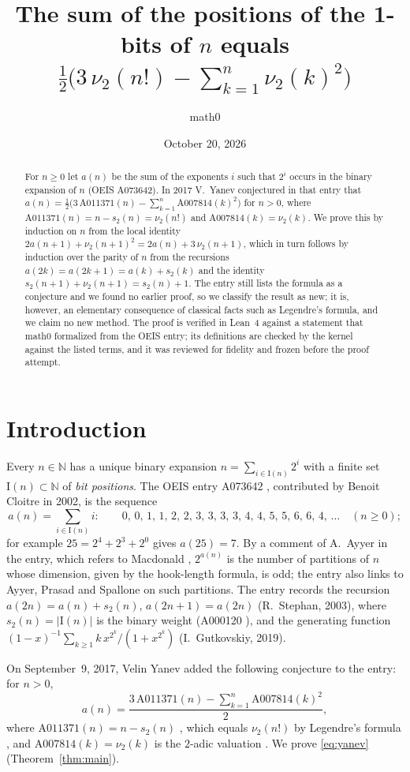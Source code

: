 \documentclass[11pt]{amsart}
\title[Yanev's identity for OEIS A073642]{The sum of the positions of the 1-bits of $n$ equals $\tfrac12\bigl(3\,\nu_2(n!)-\sum_{k=1}^{n}\nu_2(k)^2\bigr)$}
\author{math0}
\date{October 20, 2026}
\theoremstyle{plain}
\theoremstyle{definition}
\newcommand{\N}{\mathbb{N}}
\newcommand{\vt}{\nu_2}
\newcommand{\Bits}{\mathrm{I}}
\begin{document}
\begin{abstract}
For $n\ge0$ let $a(n)$ be the sum of the exponents $i$ such that $2^i$ occurs in the binary expansion of $n$ (OEIS A073642). In 2017 V.~Yanev conjectured in that entry that $a(n)=\frac12\bigl(3\,\mathrm{A011371}(n)-\sum_{k=1}^{n}\mathrm{A007814}(k)^2\bigr)$ for $n>0$, where $\mathrm{A011371}(n)=n-s_2(n)=\nu_2(n!)$ and $\mathrm{A007814}(k)=\nu_2(k)$.
We prove this by induction on $n$ from the local identity $2a(n+1)+\nu_2(n+1)^2=2a(n)+3\,\nu_2(n+1)$, which in turn follows by induction over the parity of $n$ from the recursions $a(2k)=a(2k+1)=a(k)+s_2(k)$ and the identity $s_2(n+1)+\nu_2(n+1)=s_2(n)+1$.
The entry still lists the formula as a conjecture and we found no earlier proof, so we classify the result as new; it is, however, an elementary consequence of classical facts such as Legendre's formula, and we claim no new method.
The proof is verified in Lean~4 against a statement that math0 formalized from the OEIS entry; its definitions are checked by the kernel against the listed terms, and it was reviewed for fidelity and frozen before the proof attempt.
\end{abstract}
\maketitle

\section{Introduction}

Every $n\in\N$ has a unique binary expansion $n=\sum_{i\in\Bits(n)}2^i$ with a finite set $\Bits(n)\subset\N$ of \emph{bit positions}. The OEIS entry A073642 \cite{A073642}, contributed by Benoit Cloitre in 2002, is the sequence
\[
  a(n)=\sum_{i\in\Bits(n)} i:\qquad 0,\,0,\,1,\,1,\,2,\,2,\,3,\,3,\,3,\,3,\,4,\,4,\,5,\,5,\,6,\,6,\,4,\,\dots\quad(n\ge0);
\]
for example $25=2^4+2^3+2^0$ gives $a(25)=7$. By a comment of A.~Ayyer in the entry, which refers to Macdonald \cite{Macdonald}, $2^{a(n)}$ is the number of partitions of $n$ whose dimension, given by the hook-length formula, is odd; the entry also links to Ayyer, Prasad and Spallone \cite{APS} on such partitions. The entry records the recursion $a(2n)=a(n)+s_2(n)$, $a(2n+1)=a(2n)$ (R.~Stephan, 2003), where $s_2(n)=|\Bits(n)|$ is the binary weight (A000120 \cite{A000120}), and the generating function $(1-x)^{-1}\sum_{k\ge1}k\,x^{2^k}/(1+x^{2^k})$ (I.~Gutkovskiy, 2019).

On September~9, 2017, Velin Yanev added the following conjecture to the entry: for $n>0$,
\begin{equation}\label{eq:yanev}
  a(n)=\frac{3\,\mathrm{A011371}(n)-\sum_{k=1}^{n}\mathrm{A007814}(k)^2}{2},
\end{equation}
where $\mathrm{A011371}(n)=n-s_2(n)$ \cite{A011371}, which equals $\vt(n!)$ by Legendre's formula \cite{Legendre}, and $\mathrm{A007814}(k)=\vt(k)$ is the $2$-adic valuation \cite{A007814}. We prove \eqref{eq:yanev} (Theorem~\ref{thm:main}).
\end{document}
